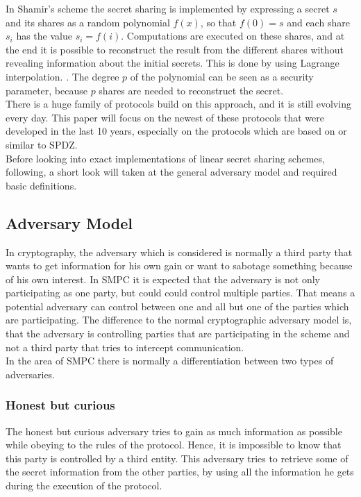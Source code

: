 \documentclass[english,runningheads,a4paper]{llncs}[2018/03/10]
\begin{document}
In Shamir's scheme the secret sharing is implemented by expressing a secret $s$ and its shares as a random polynomial $f(x)$, so that $f(0)=s$ and each share $s_i$ has the value $s_i=f(i)$. Computations are executed on these shares, and at the end it is possible to reconstruct the result from the different shares without revealing information about the initial secrets. This is done by using Lagrange interpolation. . The degree $p$ of the polynomial can be seen as a security parameter, because $p$ shares are needed to reconstruct the secret.\\
There is a huge family of protocols build on this approach, and it is still evolving every day. This paper will focus on the newest of these protocols that were developed in the last 10 years, especially on the protocols which are based on or similar to SPDZ. \\
Before looking into exact implementations of linear secret sharing schemes, following, a short look will taken at the general adversary model and required basic definitions.
\subsection{Adversary Model}
In cryptography, the adversary which is considered is normally a third party that wants to get information for his own gain or want to sabotage something because of his own interest. In SMPC it is expected that the adversary is not only participating as one party, but could could control multiple parties. That means a potential adversary can control between one and all but one of the parties which are participating. The difference to the normal cryptographic adversary model is, that the adversary is controlling parties that are participating in the scheme and not a third party that tries to intercept communication.\\
In the area of SMPC there is normally a differentiation between two types of adversaries.
\subsubsection{Honest but curious}
The honest but curious adversary tries to gain as much information as possible while obeying to the rules of the protocol. Hence, it is impossible to know that this party is controlled by a third entity. This adversary tries to retrieve some of the secret information from the other parties, by using all the information he gets during the execution of the protocol.
\end{document}
